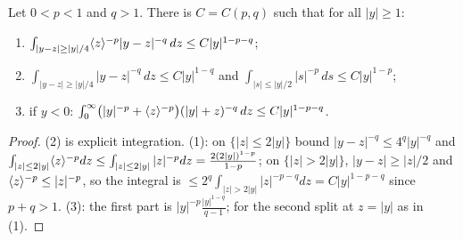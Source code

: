 \begin{lemma}
  \label{lem:c07_tail_integrals}
  Let $0<p<1$ and $q>1$. There is $C=C(p,q)$ such that for all $|y|\geq1$:
  \begin{enumerate}
    \item $\int_{|y-z|\ge|y|/4}\langle z \rangle^{-p}|y-z|^{-q}\,dz\le C|y|^{1-p-q}$;
    \item $\int_{|y-z|\ge|y|/4}|y-z|^{-q}\,dz\le C|y|^{1-q}$ and $\int_{|s|\le|y|/2}|s|^{-p}\,ds\le C|y|^{1-p}$;
    \item if $y<0$: $\int_0^\infty\bigl(|y|^{-p}+\langle z \rangle^{-p}\bigr)(|y|+z)^{-q}\,dz\le C|y|^{1-p-q}$.
  \end{enumerate}
\end{lemma}
\begin{proof}
  (2) is explicit integration. (1): on $\{|z|\le2|y|\}$ bound $|y-z|^{-q}\le4^q|y|^{-q}$ and
  $\int_{|z|\le2|y|}\langle z \rangle^{-p}dz\le\int_{|z|\le2|y|}|z|^{-p}dz=\frac{2(2|y|)^{1-p}}{1-p}$; on
  $\{|z|>2|y|\}$, $|y-z|\ge|z|/2$ and $\langle z \rangle^{-p}\le|z|^{-p}$, so the integral is
  $\le2^q\int_{|z|>2|y|}|z|^{-p-q}dz=C|y|^{1-p-q}$ since $p+q>1$. (3): the first part is
  $|y|^{-p}\frac{|y|^{1-q}}{q-1}$; for the second split at $z=|y|$ as in (1).
\end{proof}


